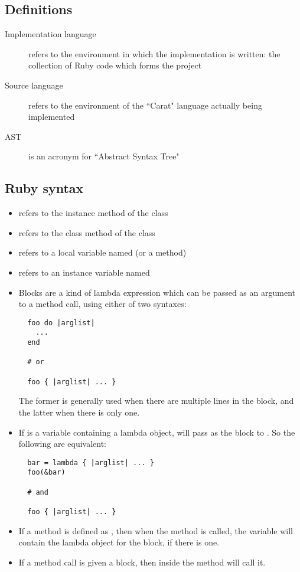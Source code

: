 \subsection{Definitions}

\begin{description}
	\item[Implementation language] refers to the environment in which the implementation is written: the collection of Ruby code which forms the project
	\item[Source language] refers to the environment of the ``Carat" language actually being implemented
	\item[AST] is an acronym for ``Abstract Syntax Tree"
\end{description}

\subsection{Ruby syntax}

\begin{itemize}
  \item {} refers to the instance method  of the class 
  
  \item {} refers to the class method  of the class 
  
  \item {} refers to a local variable named  (or a method)
  
  \item {} refers to an instance variable named 
  
  \item Blocks are a kind of lambda expression which can be passed as an argument to a method call, using either of two syntaxes:
  \begin{lstlisting}
  foo do |arglist|
    ...
  end
  
  # or
  
  foo { |arglist| ... }
  \end{lstlisting}
  
  The former is generally used when there are multiple lines in the block, and the latter when there is only one.
  
  \item If  is a variable containing a lambda object,  will pass  as the block to . So the following are equivalent:
  \begin{lstlisting}
  bar = lambda { |arglist| ... }
  foo(&bar)
  
  # and
  
  foo { |arglist| ... }
  \end{lstlisting}
  
  \item If a method is defined as , then when the method is called, the  variable will contain the lambda object for the block, if there is one.
  
  \item If a method call is given a block, then  inside the method will call it.
\end{itemize}
